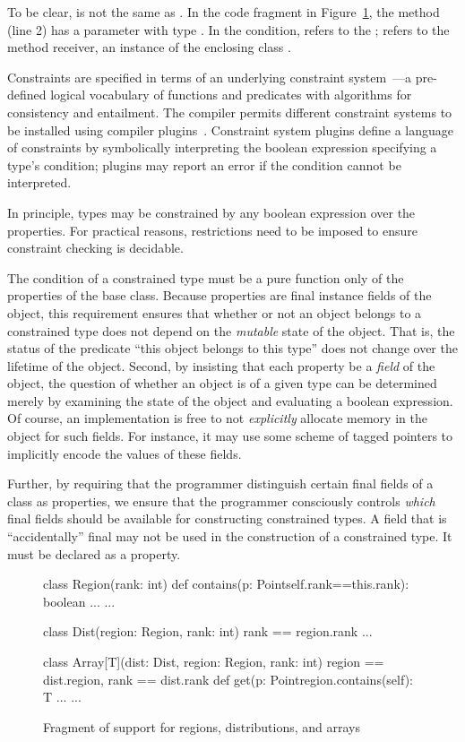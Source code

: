 To be clear,  is not the same as .
In the code fragment in Figure~\ref{fig:region}, the
method  (line 2) has a parameter 
with type .  
In the condition,  refers to the  ;
 refers to the method receiver, an instance
of the enclosing class .

Constraints are specified in terms of an underlying
constraint system~\cite{cccc}---a pre-defined logical vocabulary of
functions and predicates with algorithms for consistency and
entailment.  The \Xten{} compiler permits different constraint
systems to be installed using compiler
plugins~\cite{bracha04-pluggable}.
%
Constraint system plugins define a language of constraints by
symbolically interpreting
the boolean expression specifying a type's condition; plugins
may report an error if the condition cannot be interpreted.

In principle, types may be constrained by any boolean
expression over the properties.  For practical reasons,
restrictions need to be imposed to ensure constraint checking is
decidable.

The condition of a constrained type must be a pure
function only of the properties of the base class.
Because properties are
final instance fields of the object,
this requirement
ensures that whether or not an object belongs to a constrained type does
not depend on the {\em mutable} state of the object.
That is, the status of the
predicate ``this object belongs to this type'' does not
change over the lifetime of the object.  Second, by insisting that each
property be a {\em field} of the object, the question of
whether an object is of a given type can be
determined merely by examining the state of the object and evaluating
a boolean expression. Of course, an implementation is free to not {\em
explicitly} allocate memory in the object for such fields. For
instance, it may use some scheme of tagged pointers to implicitly
encode the values of these fields.

Further, by requiring that the programmer distinguish certain
final fields of a class as properties, we ensure that the programmer
consciously controls {\em which} final fields should be available for
constructing constrained types. A field that is ``accidentally''
final may not be used in the construction of a constrained type. It must be
declared as a property.

\begin{figure}[t]
{
\footnotesize
\begin{xtenlines}
class Region(rank: int) {
  def contains(p: Point{self.rank==this.rank}):
      boolean { ... }
  ...
}

class Dist(region: Region, rank: int)
    {rank == region.rank} { ... }

class Array[T](dist: Dist, region: Region, rank: int)
    {region == dist.region, rank == dist.rank}
{
  def get(p: Point{region.contains(self)}: T { ... }
  ...
}
\end{xtenlines}
}

\caption{Fragment of \Xten{} support for regions, distributions, and arrays}\label{fig:region}
\end{figure}


